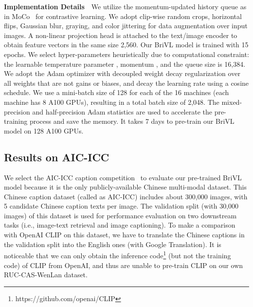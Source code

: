 \documentclass[10pt,twocolumn,letterpaper]{article}
\begin{document}
\noindent\textbf{Implementation Details}~~We utilize the momentum-updated history queue as in MoCo~\cite{he2020momentum} for contrastive learning.
We adopt clip-wise random crops, horizontal flips, Gaussian blur, graying, and color jittering for data augmentation over input images. A non-linear projection head is attached to the text/image encoder to obtain feature vectors in the same size 2,560. Our BriVL model is trained with 15 epochs. We select hyper-parameters heuristically due to computational constraint: the learnable temperature parameter , momentum , and the queue size is 16,384. We adopt the Adam optimizer with decoupled weight decay regularization over all weights that are not gains or biases, and decay the learning rate using a cosine schedule. We use a mini-batch size of 128 for each of the 16 machines (each machine has 8 A100 GPUs), resulting in a total batch size of 2,048. The mixed-precision and half-precision Adam statistics are used to accelerate the pre-training process and save the memory. It takes 7 days to pre-train our BriVL model on 128 A100 GPUs.

\subsection{Results on AIC-ICC}

We select the AIC-ICC caption competition~\cite{wu2017ai} to evaluate our pre-trained BriVL model because it is the only publicly-available Chinese multi-modal dataset. This Chinese caption dataset (called as AIC-ICC) includes about 300,000 images, with 5 candidate Chinese caption texts per image. The validation split (with 30,000 images) of this dataset is used for performance evaluation on two downstream tasks (i.e., image-text retrieval and image captioning). To make a comparison with OpenAI CLIP on this dataset, we have to translate the Chinese captions in the validation split into the English ones (with Google Translation). It is noticeable that we can only obtain the inference code\footnote{https://github.com/openai/CLIP} (but not the training code) of CLIP from OpenAI, and thus are unable to pre-train CLIP on our own RUC-CAS-WenLan dataset.
\end{document}
